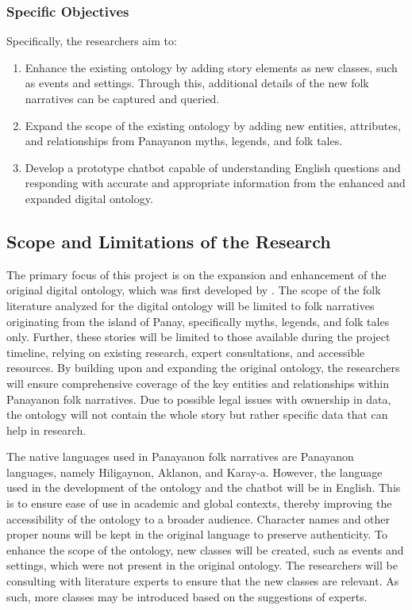 \subsubsection{Specific Objectives}
\label{subsec:specificobjectives}
Specifically, the researchers aim to:
\begin{enumerate}
    \item Enhance the existing ontology by adding story elements as new classes, such as events and settings. Through this, additional details of the new folk narratives can be captured and queried.
    \item Expand the scope of the existing ontology by adding new entities, attributes, and relationships from Panayanon myths, legends, and folk tales. 
    \item Develop a prototype chatbot capable of understanding English questions and responding with accurate and appropriate information from the enhanced and expanded digital ontology.
\end{enumerate}


\subsection{Scope and Limitations of the Research}
\label{sec:scopelimitations}

The primary focus of this project is on the expansion and enhancement of the original digital ontology, which was first developed by . The scope of the folk literature analyzed for the digital ontology will be limited to folk narratives originating from the island of Panay, specifically myths, legends, and folk tales only. Further, these stories will be limited to those available during the project timeline, relying on existing research, expert consultations, and accessible resources. By building upon and expanding the original ontology, the researchers will ensure comprehensive coverage of the key entities and relationships within Panayanon folk narratives. Due to possible legal issues with ownership in data, the ontology will not contain the whole story but rather specific data that can help in research.

The native languages used in Panayanon folk narratives are Panayanon languages, namely Hiligaynon, Aklanon, and Karay-a. However, the language used in the development of the ontology and the chatbot will be in English. This is to ensure ease of use in academic and global contexts, thereby improving the accessibility of the ontology to a broader audience. Character names and other proper nouns will be kept in the original language to preserve authenticity.
To enhance the scope of the ontology, new classes will be created, such as events and settings, which were not present in the original ontology. The researchers will be consulting with literature experts to ensure that the new classes are relevant. As such, more classes may be introduced based on the suggestions of experts.

